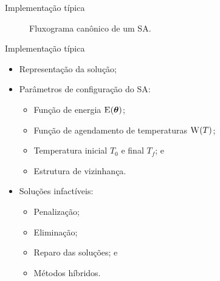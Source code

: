 \documentclass{beamer}
\newcommand{\tabela}[3]{
\begin{table}[!htbp]
  \scalefont{#3}
  \begin{center}
  \caption{#2}\label{tab:#1}
    
  \end{center}
\end{table}
}
\begin{document}
    

\begin{frame}{Implementação típica}
  \begin{figure}[H]
    \begin{center}  
    \end{center}
    \caption{Fluxograma canônico de um SA.}
  \end{figure}
\end{frame}


%   

\begin{frame}[noframenumbering]{Implementação típica}
  \begin{itemize}
    \item Representação da solução;
    \vspace{0.5em}
    \item Parâmetros de configuração do SA:
    \begin{itemize}
      \item Função de energia $\textsc{E}(\boldsymbol{\theta})$;
      \item Função de agendamento de temperaturas $\textsc{W}(T)$;
      \item Temperatura inicial $T_0$ e final $T_f$; e
      \item Estrutura de vizinhança.
    \end{itemize}
    \vspace{0.5em}
    \item Soluções infactíveis:
    \begin{itemize}
      \item Penalização;
      \item Eliminação;
      \item Reparo das soluções; e
      \item Métodos híbridos.
    \end{itemize}
  \end{itemize}
\end{frame}
\end{document}
